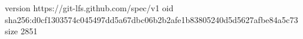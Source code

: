 version https://git-lfs.github.com/spec/v1
oid sha256:d0cf1303574c045497dd5a67dbc06b2b2afe1b83805240d5d5627afbe84a5c73
size 2851
